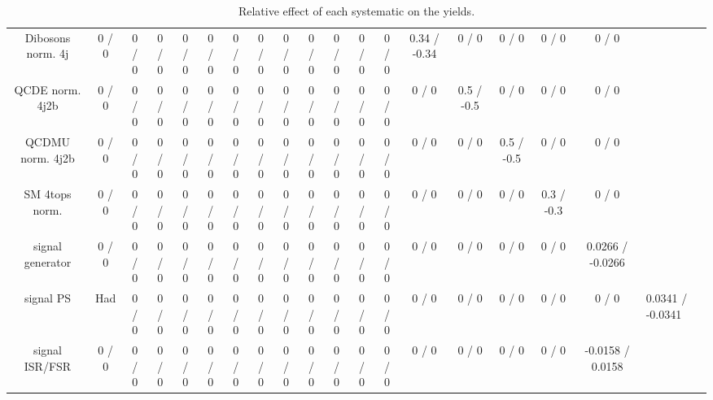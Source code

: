 \documentclass[10pt]{article}
\begin{document}
\begin{table}[htbp]
\begin{center}
\begin{tabular}{|c|c|c|c|c|c|c|c|c|c|c|c|c|c|c|c|c|c|}
  Dibosons norm. 4j & 0 / 0 & 0 / 0 & 0 / 0 & 0 / 0 & 0 / 0 & 0 / 0 & 0 / 0 & 0 / 0 & 0 / 0 & 0 / 0 & 0 / 0 & 0 / 0 & 0.34 / -0.34 & 0 / 0 & 0 / 0 & 0 / 0 & 0 / 0 \\ 
  QCDE norm. 4j2b & 0 / 0 & 0 / 0 & 0 / 0 & 0 / 0 & 0 / 0 & 0 / 0 & 0 / 0 & 0 / 0 & 0 / 0 & 0 / 0 & 0 / 0 & 0 / 0 & 0 / 0 & 0.5 / -0.5 & 0 / 0 & 0 / 0 & 0 / 0 \\ 
  QCDMU norm. 4j2b & 0 / 0 & 0 / 0 & 0 / 0 & 0 / 0 & 0 / 0 & 0 / 0 & 0 / 0 & 0 / 0 & 0 / 0 & 0 / 0 & 0 / 0 & 0 / 0 & 0 / 0 & 0 / 0 & 0.5 / -0.5 & 0 / 0 & 0 / 0 \\ 
  SM 4tops norm. & 0 / 0 & 0 / 0 & 0 / 0 & 0 / 0 & 0 / 0 & 0 / 0 & 0 / 0 & 0 / 0 & 0 / 0 & 0 / 0 & 0 / 0 & 0 / 0 & 0 / 0 & 0 / 0 & 0 / 0 & 0.3 / -0.3 & 0 / 0 \\ 
  signal generator & 0 / 0 & 0 / 0 & 0 / 0 & 0 / 0 & 0 / 0 & 0 / 0 & 0 / 0 & 0 / 0 & 0 / 0 & 0 / 0 & 0 / 0 & 0 / 0 & 0 / 0 & 0 / 0 & 0 / 0 & 0 / 0 & 0.0266 / -0.0266 \\ 
  signal PS & Had & 0 / 0 & 0 / 0 & 0 / 0 & 0 / 0 & 0 / 0 & 0 / 0 & 0 / 0 & 0 / 0 & 0 / 0 & 0 / 0 & 0 / 0 & 0 / 0 & 0 / 0 & 0 / 0 & 0 / 0 & 0 / 0 & 0.0341 / -0.0341 \\ 
  signal ISR/FSR & 0 / 0 & 0 / 0 & 0 / 0 & 0 / 0 & 0 / 0 & 0 / 0 & 0 / 0 & 0 / 0 & 0 / 0 & 0 / 0 & 0 / 0 & 0 / 0 & 0 / 0 & 0 / 0 & 0 / 0 & 0 / 0 & -0.0158 / 0.0158 \\ 
\hline 
\end{tabular} 
\caption{Relative effect of each systematic on the yields.} 
\end{center} 
\end{table} 
\end{document}
